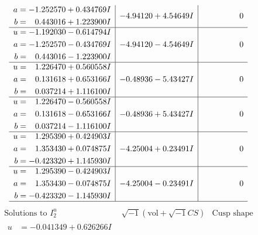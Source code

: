 \documentclass[1p]{elsarticle_modified}
\theoremstyle{definition}
\newcommand{\I}{\sqrt{-1}}
\begin{document}
$$\begin{array}{c|c|c}
\begin{aligned}
a &= -1.252570 + 0.434769 I \\
b &= \phantom{-}0.443016 + 1.223900 I\end{aligned}
 & -4.94120 + 4.54649 I & \phantom{-0.000000 } 0 \\ \hline\begin{aligned}
u &= -1.192030 - 0.614794 I \\
a &= -1.252570 - 0.434769 I \\
b &= \phantom{-}0.443016 - 1.223900 I\end{aligned}
 & -4.94120 - 4.54649 I & \phantom{-0.000000 } 0 \\ \hline\begin{aligned}
u &= \phantom{-}1.226470 + 0.560558 I \\
a &= \phantom{-}0.131618 + 0.653166 I \\
b &= \phantom{-}0.037214 + 1.116100 I\end{aligned}
 & -0.48936 - 5.43427 I & \phantom{-0.000000 } 0 \\ \hline\begin{aligned}
u &= \phantom{-}1.226470 - 0.560558 I \\
a &= \phantom{-}0.131618 - 0.653166 I \\
b &= \phantom{-}0.037214 - 1.116100 I\end{aligned}
 & -0.48936 + 5.43427 I & \phantom{-0.000000 } 0 \\ \hline\begin{aligned}
u &= \phantom{-}1.295390 + 0.424903 I \\
a &= \phantom{-}1.353430 + 0.074875 I \\
b &= -0.423320 + 1.145930 I\end{aligned}
 & -4.25004 + 0.23491 I & \phantom{-0.000000 } 0 \\ \hline\begin{aligned}
u &= \phantom{-}1.295390 - 0.424903 I \\
a &= \phantom{-}1.353430 - 0.074875 I \\
b &= -0.423320 - 1.145930 I\end{aligned}
 & -4.25004 - 0.23491 I & \phantom{-0.000000 } 0\\
 \hline 
 \end{array}$$\newpage$$\begin{array}{c|c|c}  
\text{Solutions to }I^u_{2}& \I (\text{vol} + \sqrt{-1}CS) & \text{Cusp shape}\\
 \hline 
\begin{aligned}
u &= -0.041349 + 0.626266 I \\

\end{aligned}
\end{array}$$
\end{document}
